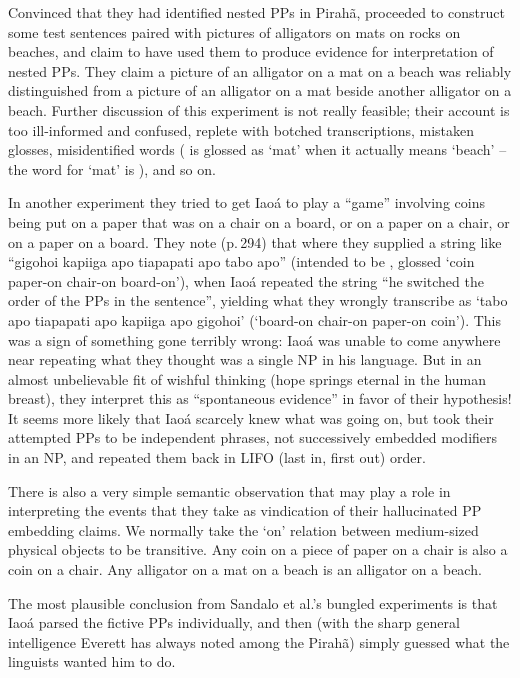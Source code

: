 \documentclass[output=paper,colorlinks,citecolor=brown
]{langscibook}
\begin{document}
Convinced that they had identified nested PPs in Pirah{\~a}, \citet[289--292]{SandaloEtAl18} proceeded to construct some
test sentences paired with pictures of alligators on mats on rocks on
beaches, and claim to have used them to produce evidence for
interpretation of nested PPs. They claim a picture of an alligator on
a mat on a beach was reliably distinguished from a picture of an
alligator on a mat beside another alligator on a beach. Further
discussion of this experiment is not really feasible; their account is
too ill-informed and confused, replete with botched transcriptions,
mistaken glosses, misidentified words ( is glossed as
`mat' when it actually means `beach' -- the word for `mat' is
), and so on.

In another experiment they tried to get Iao{\'a} to play a ``game''
involving coins being put on a paper that was on a chair on a board,
or on a paper on a chair, or on a paper on a board. They note (p.\,294)
that where they supplied a string like ``gigohoi kapiiga apo tiapapati
apo tabo apo'' (intended to be , glossed `coin paper-on chair-on board-on'),
when Iao{\'a} repeated the string ``he switched the order of the PPs in
the sentence'', yielding what they wrongly transcribe as `tabo apo
tiapapati apo kapiiga apo gigohoi' (`board-on chair-on paper-on coin').
This was a sign of something gone terribly wrong: Iao{\'a} was unable
to come anywhere near repeating what they thought was a single NP in
his language. But in an almost unbelievable fit of wishful thinking
(hope springs eternal in the human breast), they interpret this as
``spontaneous evidence'' in favor of their hypothesis!
It seems more likely that Iao{\'a} scarcely knew what was going on,
but took their attempted PPs to be independent phrases, not
successively embedded modifiers in an NP, and repeated them back in
LIFO (last in, first out) order.

There is also a very simple semantic observation that may play a
role in interpreting the events that they take as vindication of their
hallucinated PP embedding claims. We normally take the `on' relation
between medium-sized physical objects to be transitive. Any coin on
a piece of paper on a chair is also a coin on a chair. Any alligator
on a mat on a beach is an alligator on a beach.

The most plausible conclusion from Sandalo et al.'s bungled experiments
is that Iao{\'a} parsed the fictive PPs individually, and then (with the
sharp general intelligence Everett has always noted among the Pirah{\~a})
simply guessed what the linguists wanted him to do.
\end{document}
